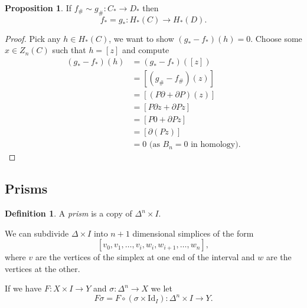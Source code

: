 \documentclass[12pt]{article}
\theoremstyle{definition}
\newtheorem{prop}[thm]{Proposition}
\theoremstyle{definition}
\newtheorem{defn}[thm]{Definition}
\newcommand{\C}{C_*}
\renewcommand{\H}{H_*}
\begin{document}
\begin{prop}
If $f_\#\sim g_\#\colon \C \to D_*$ then 
\[
f_* = g_* \colon \H(C) \to \H(D).
\]
\end{prop}
\begin{proof}
Pick any $h\in\H(C)$, we want to show $(g_* - f_*)(h) = 0$.
Choose some $x\in Z_n(C)$ such that $h = [z]$ and compute
\begin{align*}
(g_* - f_*)(h) &= (g_* - f_*)([z])\\
 &= [(g_\#- f_\#)(z)]\\
 &= [(P\partial + \partial P)(z)]\\
 &= [P\partial z + \partial Pz]\\
 &= [P0 + \partial Pz]\\
 &= [\partial(Pz)]\\
 &= 0\text{ (as }B_n = 0\text{ in homology)}.
\end{align*}
\end{proof}

\subsection{Prisms}
\begin{defn}
A \emph{prism} is a copy of $\Delta^n \times I$.
\end{defn}

We can subdivide $\Delta\times I$ into $n+1$ dimensional simplices of the form
\[
[v_0,v_1,\ldots,v_i,w_i,w_{i+1},\ldots,w_n],
\]
where $v$ are the vertices of the simplex at one end of the interval and $w$ are the vertices at the other.

If we have $F\colon X\times I \to Y$ and $\sigma\colon \Delta^n \to X$ we let
\[
F\sigma = F\circ(\sigma \times \mathrm{Id}_I)\colon \Delta^n \times I \to Y.
\]
\end{document}
